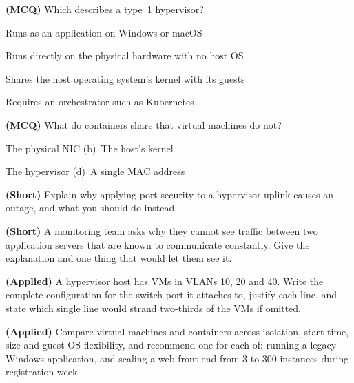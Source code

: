 \begin{reviewq}
  \item \textbf{(MCQ)} Which describes a type~1 hypervisor?
        \begin{tight}
          \item[(a)] Runs as an application on Windows or macOS
          \item[(b)] Runs directly on the physical hardware with no host OS
          \item[(c)] Shares the host operating system's kernel with its guests
          \item[(d)] Requires an orchestrator such as Kubernetes
        \end{tight}
  \item \textbf{(MCQ)} What do containers share that virtual machines do not?
        \begin{tight}
          \item[(a)] The physical NIC \quad (b)~The host's kernel
          \item[(c)] The hypervisor \quad (d)~A single MAC address
        \end{tight}
  \item \textbf{(Short)} Explain why applying port security to a hypervisor
        uplink causes an outage, and what you should do instead.
  \item \textbf{(Short)} A monitoring team asks why they cannot see traffic
        between two application servers that are known to communicate constantly.
        Give the explanation and one thing that would let them see it.
  \item \textbf{(Applied)} A hypervisor host has VMs in VLANs 10, 20 and 40.
        Write the complete configuration for the switch port it attaches to,
        justify each line, and state which single line would strand two-thirds of
        the VMs if omitted.
  \item \textbf{(Applied)} Compare virtual machines and containers across
        isolation, start time, size and guest OS flexibility, and recommend one
        for each of: running a legacy Windows application, and scaling a web
        front end from 3 to 300 instances during registration week.
\end{reviewq}
